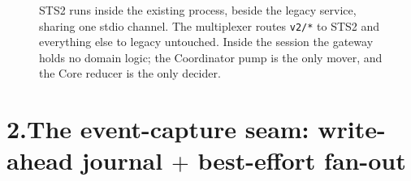 \documentclass[11pt]{article}
\newcommand{\code}[1]{\texttt{\small #1}}
\begin{document}
\begin{figure}[H]
{}
\caption{STS2 runs inside the existing process, beside the legacy service, sharing one
stdio channel. The multiplexer routes \code{v2/*} to STS2 and everything else to legacy
untouched. Inside the session the gateway holds no domain logic; the Coordinator pump is the
only mover, and the Core reducer is the only decider.}
\end{figure}

\section*{2.\quad The event-capture seam: write-ahead journal $+$ best-effort fan-out}
\end{document}
